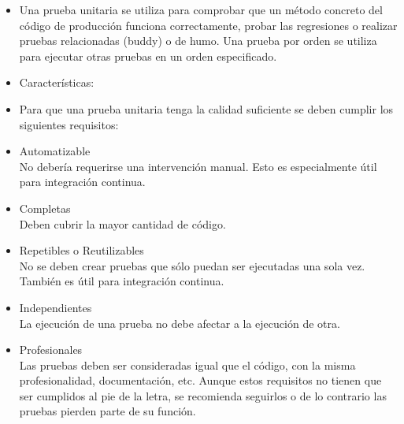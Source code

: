 \begin {itemize}
\subsection {Pruebas Unitarias}
\item Una prueba unitaria se utiliza para comprobar que un método concreto del código de producción funciona correctamente, probar las regresiones o realizar pruebas relacionadas (buddy) o de humo. Una prueba por orden se utiliza para ejecutar otras pruebas en un orden especificado. 
\item Características:
\item Para que una prueba unitaria tenga la calidad suficiente se deben cumplir los siguientes requisitos:
\item Automatizable\\
 No debería requerirse una intervención manual. Esto es especialmente útil para integración continua.
\item Completas\\
 Deben cubrir la mayor cantidad de código.
\item Repetibles o Reutilizables\\
No se deben crear pruebas que sólo puedan ser ejecutadas una sola vez. También es útil para integración continua.
\item Independientes\\
 La ejecución de una prueba no debe afectar a la ejecución de otra.
\item Profesionales\\
 Las pruebas deben ser consideradas igual que el código, con la misma profesionalidad, documentación, etc.
Aunque estos requisitos no tienen que ser cumplidos al pie de la letra, se recomienda seguirlos o de lo contrario las pruebas pierden parte de su función.
\end{itemize}
